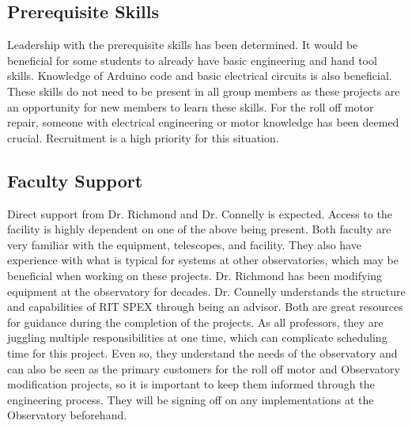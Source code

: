 \documentclass[conference]{IEEEtran} %
\begin{document}
\subsection{Prerequisite Skills}
  Leadership with the prerequisite skills has been determined. It would be beneficial for some students to already have basic engineering and hand tool skills. Knowledge of Arduino code and basic electrical circuits is also beneficial. These skills do not need to be present in all group members as these projects are an opportunity for new members to learn these skills. For the roll off motor repair, someone with electrical engineering or motor  knowledge has been deemed crucial. Recruitment is a high priority for this situation. 
  
\subsection{Faculty Support}  
  Direct support from Dr. Richmond and Dr. Connelly is
expected. Access to the facility is highly dependent on one
of the above being present. Both faculty are very familiar
with the equipment, telescopes, and facility. They also have
experience with what is typical for systems at other observatories, which may be beneficial when working on these
projects. Dr. Richmond has been modifying equipment at
the observatory for decades. Dr. Connelly understands the
structure and capabilities of RIT SPEX through being an
advisor. Both are great resources for guidance during the
completion of the projects. As all professors, they are juggling
multiple responsibilities at one time, which can complicate
scheduling time for this project. Even so, they understand the
needs of the observatory and can also be seen as the primary
customers for the roll off motor and Observatory modification projects, so it is important to keep them
informed through the engineering process. They will be signing off on any implementations at the Observatory beforehand.
  
\end{document}
